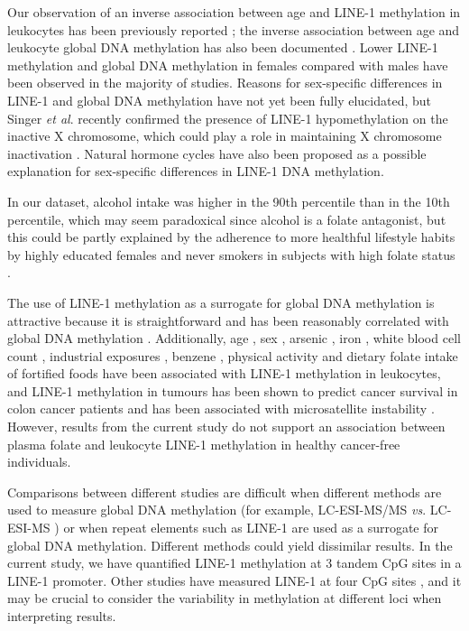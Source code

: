 \noindent Our observation of an inverse association between age and LINE-1 methylation in leukocytes has been previously reported \cite{c37}; the inverse association between age and leukocyte global DNA methylation has also been documented \cite{c38,c39}. Lower LINE-1 methylation \cite{c310,c312} and global DNA methylation \cite{c39} in females compared with males have been observed in the majority of studies. Reasons for sex-specific differences in LINE-1 and global DNA methylation have not yet been fully elucidated, but Singer \emph{et al}. recently confirmed the presence of LINE-1 hypomethylation on the inactive X chromosome, which could play a role in maintaining X chromosome inactivation \cite{c331}. Natural hormone cycles \cite{c332} have also been proposed as a possible explanation for sex-specific differences in LINE-1 DNA methylation.

\noindent In our dataset, alcohol intake was higher in the 90th percentile than in the 10th percentile, which may seem paradoxical since alcohol is a folate antagonist, but this could be partly explained by the adherence to more healthful lifestyle habits by highly educated females and never smokers in subjects with high folate status \cite{c333}.

\noindent The use of LINE-1 methylation as a surrogate for global DNA methylation is attractive because it is straightforward and has been reasonably correlated with global DNA methylation \cite{c328}. Additionally, age \cite{c37,c39}, sex \cite{c310,c313}, arsenic \cite{c311}, iron \cite{c311}, white blood cell count \cite{c310}, industrial exposures \cite{c314}, benzene \cite{c315}, physical activity \cite{c316} and dietary folate intake of fortified foods \cite{c317} have been associated with LINE-1 methylation in leukocytes, and LINE-1 methylation in tumours has been shown to predict cancer survival in colon cancer patients \cite{c334} and has been associated with microsatellite instability \cite{c335}. However, results from the current study do not support an association between plasma folate and leukocyte LINE-1 methylation in healthy cancer-free individuals.

\noindent Comparisons between different studies are difficult when different methods are used to measure global DNA methylation (for example, LC-ESI-MS/MS \cite{c319} \emph{vs}. LC-ESI-MS \cite{c318}) or when repeat elements such as LINE-1 are used as a surrogate for global DNA methylation. Different methods could yield dissimilar results. In the current study, we have quantified LINE-1 methylation at 3 tandem CpG sites in a LINE-1 promoter. Other studies have measured LINE-1 at four CpG sites \cite{c311}, and it may be crucial to consider the variability in methylation at different loci \cite{c331} when interpreting results.

